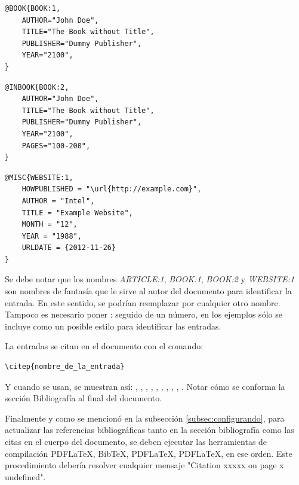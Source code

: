 \begin{lstlisting}
@BOOK{BOOK:1,
    AUTHOR="John Doe",
    TITLE="The Book without Title",
    PUBLISHER="Dummy Publisher",
    YEAR="2100",
}
\end{lstlisting}


\begin{lstlisting}
@INBOOK{BOOK:2,
    AUTHOR="John Doe",
    TITLE="The Book without Title",
    PUBLISHER="Dummy Publisher",
    YEAR="2100",
    PAGES="100-200",
}
\end{lstlisting}


\begin{lstlisting}
@MISC{WEBSITE:1,
    HOWPUBLISHED = "\url{http://example.com}",
    AUTHOR = "Intel",
    TITLE = "Example Website",
    MONTH = "12",
    YEAR = "1988",
    URLDATE = {2012-11-26}
}
\end{lstlisting}

Se debe notar que los nombres \emph{ARTICLE:1}, \emph{BOOK:1}, \emph{BOOK:2} y \emph{WEBSITE:1} 
son nombres de fantasía que le sirve al autor del documento para identificar la entrada. 
En este sentido, se podrían reemplazar por cualquier otro nombre.  Tampoco es necesario poner : seguido de un número, en los ejemplos sólo se incluye como un posible estilo para identificar las entradas.

La entradas se citan en el documento con el comando: 

\begin{verbatim}
\citep{nombre_de_la_entrada}
\end{verbatim}


Y cuando se usan, se muestran así: 
\citep{CITE:1}, \citep{CITE:2}, \citep{CITE:3}, \citep{CITE:4},
\citep{CITE:5}, \citep{CITE:6}, \citep{CITE:7}, \citep{CITE:8}, 
\citep{CITE:9}, \citep{CITE:10}.  Notar cómo se conforma la sección Bibliografía al final del documento.

Finalmente y como se mencionó en la subsección \ref{subsec:configurando}, para actualizar las referencias bibliográficas tanto en la sección bibliografía como las citas en el cuerpo del documento, se deben ejecutar las herramientas de compilación PDFLaTeX, BibTeX, PDFLaTeX, PDFLaTeX, en ese orden.  Este procedimiento debería resolver cualquier mensaje "Citation xxxxx on page x undefined".

